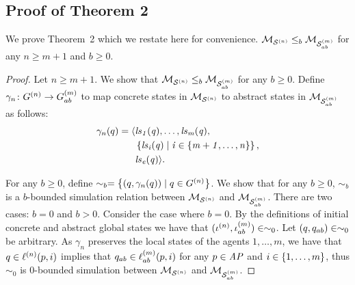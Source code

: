 \documentclass{article}
\newenvironment{customthm}[1]
  {\renewcommand\theinnercustomthm{#1}\innercustomthm}
  {\endinnercustomthm}
\begin{document}
\subsection{Proof of Theorem 2}
We prove Theorem~2 which we restate here for convenience.
\begin{customthm}{2}
$\mathcal{M}_{\mathcal{S}^{(n)}} \leq_b \mathcal{M}_{\mathcal{S}_{ab}^{(m)}}$ for any $n \geq m+1$ and $b \geq 0$.
\end{customthm}
\begin{proof}
Let $n \geq m+1$. We show that $\mathcal{M}_{\mathcal{S}^{(n)}}
\leq_b \mathcal{M}_{\mathcal{S}_{ab}^{(m)}}$ for any $b \geq 0$.
 Define $\gamma_n
\colon G^{(n)} \rightarrow G^{(m)}_{ab}$ to map concrete states in
$\mathcal{M}_{\mathcal{S}^{(n)}}$ to abstract states in $\mathcal{M}_{\mathcal{S}_{ab}^{(m)}}$ as follows:
\begin{align*}
  \gamma_n(q) =  \langle &\it{ls}_{1}(q), \ldots, \it{ls}_{m}(q), \\
  &\left \{ \it{ls}_{i}(q) \mid i \in \left \{ m + 1, \ldots, n \right \} \right \}, \\
  &\it{ls}_{e}(q)  \rangle.
\end{align*}

For any $b \geq 0$, define $\sim_b = \left \{ (q, \gamma_n(q)) \mid q \in
    G^{(n)}  \right \}$. We show that for any $b \geq 0$, $\sim_b$ is a
    $b$-bounded simulation relation between $\mathcal{M}_{\mathcal{S}^{(n)}}$ and $\mathcal{M}_{\mathcal{S}_{ab}^{(m)}}$. There are
    two cases: $b=0$ and $b >0$. Consider the case where $b=0$. By the
    definitions of initial concrete and abstract global states we have that
    $(\iota^{({n})}, \iota^{({m})}_{ab}) \in \sim_0$. Let $(q, q_{ab}) \in
    \sim_0$ be arbitrary. As $\gamma_n$ preserves the local states of the
    agents $1, \ldots, m$, we have that $q \in \ell^{(n)}(p, i)$ implies that
    $q_{ab} \in \ell^{(m)}_{ab}(p, i)$ for any $p \in \it{AP}$ and $i \in
    \left \{ 1, \ldots, m \right \}$, thus $\sim_0$ is $0$-bounded simulation between $\mathcal{M}_{\mathcal{S}^{(n)}}$ and $\mathcal{M}_{\mathcal{S}_{ab}^{(m)}}$.  


\end{proof}
\end{document}

